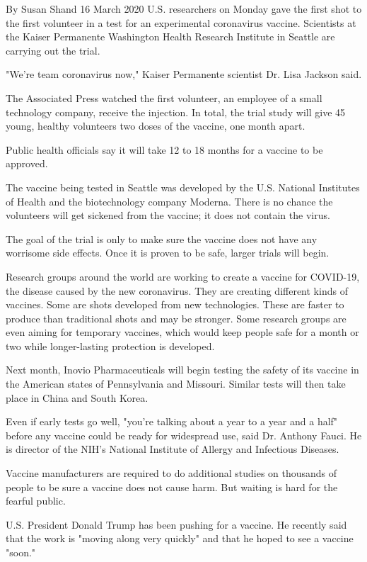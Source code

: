 By Susan Shand
16 March 2020
U.S. researchers on Monday gave the first shot to the first volunteer in a test for an experimental coronavirus vaccine. Scientists at the Kaiser Permanente Washington Health Research Institute in Seattle are carrying out the trial.

"We're team coronavirus now," Kaiser Permanente scientist Dr. Lisa Jackson said.

The Associated Press watched the first volunteer, an employee of a small technology company, receive the injection. In total, the trial study will give 45 young, healthy volunteers two doses of the vaccine, one month apart.

Public health officials say it will take 12 to 18 months for a vaccine to be approved.

The vaccine being tested in Seattle was developed by the U.S. National Institutes of Health and the biotechnology company Moderna. There is no chance the volunteers will get sickened from the vaccine; it does not contain the virus.

The goal of the trial is only to make sure the vaccine does not have any worrisome side effects. Once it is proven to be safe, larger trials will begin.

Research groups around the world are working to create a vaccine for COVID-19, the disease caused by the new coronavirus. They are creating different kinds of vaccines. Some are shots developed from new technologies. These are faster to produce than traditional shots and may be stronger. Some research groups are even aiming for temporary vaccines, which would keep people safe for a month or two while longer-lasting protection is developed.

Next month, Inovio Pharmaceuticals will begin testing the safety of its vaccine in the American states of Pennsylvania and Missouri. Similar tests will then take place in China and South Korea.

Even if early tests go well, "you're talking about a year to a year and a half" before any vaccine could be ready for widespread use, said Dr. Anthony Fauci. He is director of the NIH's National Institute of Allergy and Infectious Diseases.

Vaccine manufacturers are required to do additional studies on thousands of people to be sure a vaccine does not cause harm. But waiting is hard for the fearful public.

U.S. President Donald Trump has been pushing for a vaccine. He recently said that the work is "moving along very quickly" and that he hoped to see a vaccine "soon."

